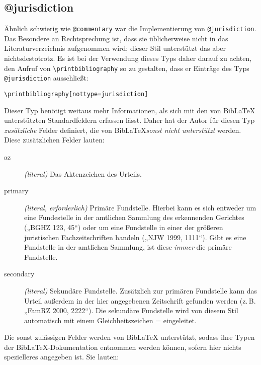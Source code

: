 \documentclass[11pt,a4paper,DIV=calc]{scrartcl}
\newcommand\software[1]{\textsf{#1}}
\newcommand\Biblatex{\software{Bib\LaTeX{}}\xspace}
\newcommand\zB{z.\,B.\xspace}
\begin{document}
\subsection{@jurisdiction}

Ähnlich schwierig wie \verb+@commentary+ war die Implementierung von
\verb+@jurisdiction+. Das Besondere an Rechtsprechung ist, dass sie
üblicherweise nicht in das Literaturverzeichnis aufgenommen wird;
dieser Stil unterstützt das aber nichtsdestotrotz. Es ist bei der
Verwendung dieses Typs daher darauf zu achten, den Aufruf von
\verb+\printbibliography+ so zu gestalten, dass er Einträge des Typs
\verb+@jurisdiction+ ausschließt:

\begin{verbatim}
\printbibliography[nottype=jurisdiction]
\end{verbatim}

Dieser Typ benötigt weitaus mehr Informationen, als sich mit den von
\Biblatex unterstützten Standardfeldern erfassen lässt. Daher hat der
Autor für diesen Typ \emph{zusätzliche} Felder definiert, die von
\Biblatex \emph{sonst nicht unterstützt} werden. Diese zusätzlichen
Felder lauten:

\begin{description}
\item[az] \emph{(literal)} Das Aktenzeichen des Urteils.
\item[primary] \emph{(literal, erforderlich)} Primäre
  Fundstelle. Hierbei kann es sich entweder um eine Fundestelle in der
  amtlichen Sammlung des erkennenden Gerichtes („BGHZ 123, 45“) oder
  um eine Fundstelle in einer der größeren juristischen
  Fachzeitschriften handeln („NJW 1999, 1111“). Gibt es eine
  Fundstelle in der amtlichen Sammlung, ist diese \emph{immer} die
  primäre Fundstelle.
\item[secondary] \emph{(literal)} Sekundäre Fundstelle. Zusätzlich zur
  primären Fundstelle kann das Urteil außerdem in der hier angegebenen
  Zeitschrift gefunden werden (\zB „FamRZ 2000, 2222“). Die sekundäre
  Fundstelle wird von diesem Stil automatisch mit einem
  Gleichheitszeichen = eingeleitet.
\end{description}

Die sonst zulässigen Felder werden von \Biblatex unterstützt, sodass
ihre Typen der \Biblatex-Do\-ku\-men\-ta\-tion entnommen werden können, sofern
hier nichts spezielleres angegeben ist. Sie lauten:
\end{document}
